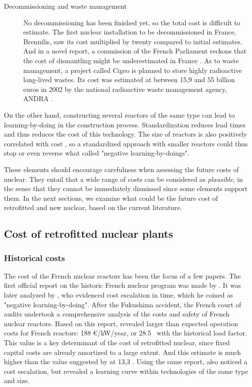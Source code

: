 \begin{description}
	\item [Decommissioning and waste management] No decommissioning has been finished yet, so the total cost is difficult to estimate. The first nuclear installation to be decommissioned in France, Brennilis, saw its cost multiplied by twenty compared to initial estimates. And in a novel report, a commission of the French Parliament reckons that the cost of dismantling might be underestimated in France \citep{AN2017}.
	As to waste management, a project called Cigeo is planned to store highly radioactive long-lived wastes. Its cost was estimated at between 15,9 and 55 billion euros in 2002 by the national radioactive waste management agency, ANDRA \citep[p. 142]{CourdesComptes2012}.
	
\end{description}

On the other hand, constructing several reactors of the same type can lead to learning-by-doing in the construction process. Standardization reduces lead times and thus reduces the cost of this technology. The size of reactors is also positively correlated with cost \citep{Rangel2015}, so a standardized approach with smaller reactors could thus stop or even reverse what \citep{Grubler2010} called "negative learning-by-doings".

These elements should encourage carefulness when assessing the future costs of nuclear. They entail that a wide range of costs can be considered as \textit{plausible}, in the sense that they cannot be immediately dismissed since some elements support them. In the next sections, we examine what could be the future cost of retrofitted and new nuclear, based on the current literature.


\subsection{Cost of retrofitted nuclear plants}

\subsubsection{Historical costs}

The cost of the French nuclear reactors has been the focus of a few papers.
The first official report on the historic French nuclear program was made by \citet{Charpin2000}.
It was later analyzed by \citet{Grubler2010}, who evidenced cost escalation in time, which he coined as "negative learning-by-doing".
After the Fukushima accident, the French court of audits undertook a comprehensive analysis of the costs and safety of French nuclear reactors. Based on this report, \citet{Boccard2014} revealed larger than expected operation costs for French reactors: 188 \euro/kW/year, or 28.5 \emwh\ with the historical load factor. This value is a key determinant of the cost of retrofitted nuclear, since fixed capital costs are already amortized to a large extent. And this estimate is much higher than the value suggested by \citet{IEA2015} at 13,3 \emwh.
Using the same report, \citet{Rangel2015} also noticed a cost escalation, but revealed a learning curve within technologies of the same type and size.


